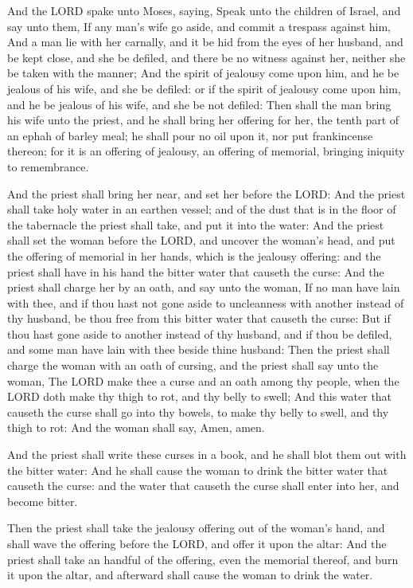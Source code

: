 \Verse And the LORD spake unto Moses, saying, \Verse Speak unto the
children of Israel, and say unto them, If any man's wife go aside, and
commit a trespass against him, \Verse And a man lie with her carnally,
and it be hid from the eyes of her husband, and be kept close, and she
be defiled, and there be no witness against her, neither she be taken
with the manner; \Verse And the spirit of jealousy come upon him, and he
be jealous of his wife, and she be defiled: or if the spirit of
jealousy come upon him, and he be jealous of his wife, and she be not
defiled: \Verse Then shall the man bring his wife unto the priest, and
he shall bring her offering for her, the tenth part of an ephah of
barley meal; he shall pour no oil upon it, nor put frankincense
thereon; for it is an offering of jealousy, an offering of memorial,
bringing iniquity to remembrance.

\Verse And the priest shall bring her near, and set her before the LORD:
\Verse And the priest shall take holy water in an earthen vessel; and of
the dust that is in the floor of the tabernacle the priest shall take,
and put it into the water: \Verse And the priest shall set the woman
before the LORD, and uncover the woman's head, and put the offering of
memorial in her hands, which is the jealousy offering: and the priest
shall have in his hand the bitter water that causeth the curse: \Verse
And the priest shall charge her by an oath, and say unto the woman, If
no man have lain with thee, and if thou hast not gone aside to
uncleanness with another instead of thy husband, be thou free from
this bitter water that causeth the curse: \Verse But if thou hast gone
aside to another instead of thy husband, and if thou be defiled, and
some man have lain with thee beside thine husband: \Verse Then the
priest shall charge the woman with an oath of cursing, and the priest
shall say unto the woman, The LORD make thee a curse and an oath among
thy people, when the LORD doth make thy thigh to rot, and thy belly to
swell; \Verse And this water that causeth the curse shall go into thy
bowels, to make thy belly to swell, and thy thigh to rot: And the
woman shall say, Amen, amen.

\Verse And the priest shall write these curses in a book, and he shall
blot them out with the bitter water: \Verse And he shall cause the woman
to drink the bitter water that causeth the curse: and the water that
causeth the curse shall enter into her, and become bitter.

\Verse Then the priest shall take the jealousy offering out of the
woman's hand, and shall wave the offering before the LORD, and offer
it upon the altar: \Verse And the priest shall take an handful of the
offering, even the memorial thereof, and burn it upon the altar, and
afterward shall cause the woman to drink the water.

